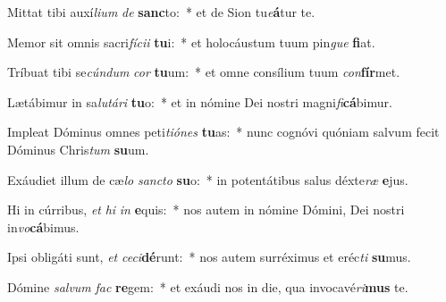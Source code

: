 \item Mittat tibi auxí\textit{li}\textit{um} \textit{de} \textbf{sanc}to:~* et de Sion tu\textit{e}\textbf{á}tur te.
\item Memor sit omnis sacri\textit{fí}\textit{ci}\textit{i} \textbf{tu}i:~* et holocáustum tuum pin\textit{gue} \textbf{fi}at.
\item Tríbuat tibi se\textit{cún}\textit{dum} \textit{cor} \textbf{tu}um:~* et omne consílium tuum \textit{con}\textbf{fír}met.
\item Lætábimur in sa\textit{lu}\textit{tá}\textit{ri} \textbf{tu}o:~* et in nómine Dei nostri magni\textit{fi}\textbf{cá}bimur.
\item Impleat Dóminus omnes peti\textit{ti}\textit{ó}\textit{nes} \textbf{tu}as:~* nunc cognóvi quóniam salvum fecit Dóminus Chris\textit{tum} \textbf{su}um.
\item Exáudiet illum de cæ\textit{lo} \textit{sanc}\textit{to} \textbf{su}o:~* in potentátibus salus déxte\textit{ræ} \textbf{e}jus.
\item Hi in cúrribus, \textit{et} \textit{hi} \textit{in} \textbf{e}quis:~* nos autem in nómine Dómini, Dei nostri in\textit{vo}\textbf{cá}bimus.
\item Ipsi obligáti sunt, \textit{et} \textit{ce}\textit{ci}\textbf{dé}runt:~* nos autem surréximus et eréc\textit{ti} \textbf{su}mus.
\item Dómine \textit{sal}\textit{vum} \textit{fac} \textbf{re}gem:~* et exáudi nos in die, qua invocavé\textit{ri}\textbf{mus} te.
